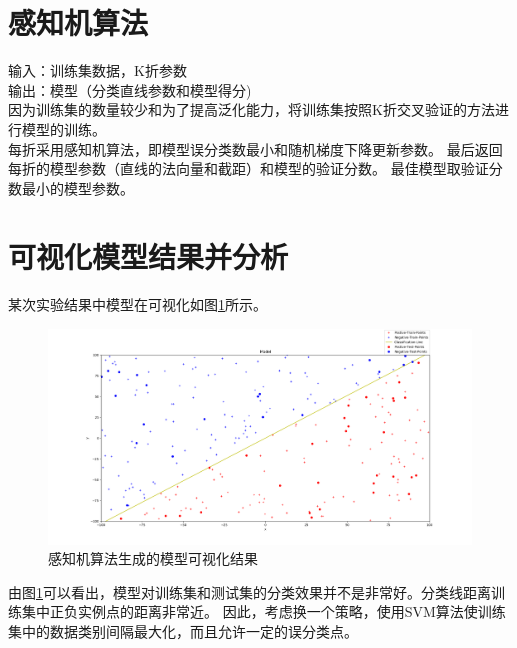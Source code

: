 \documentclass[UTF8,twoside,fontset=none,heading=true,scheme=chinese]{ctexart}
\begin{document}
    \section{感知机算法}
    \noindent 输入：训练集数据，K折参数 \\ 输出：模型（分类直线参数和模型得分) \\
    因为训练集的数量较少和为了提高泛化能力，将训练集按照K折交叉验证的方法进行模型的训练。\\
    每折采用感知机算法，即模型误分类数最小和随机梯度下降更新参数。
    最后返回每折的模型参数（直线的法向量和截距）和模型的验证分数。
    最佳模型取验证分数最小的模型参数。

    \section{可视化模型结果并分析}
    \noindent 某次实验结果中模型在可视化如图\ref{fig:per}所示。
    \begin{figure}[htb]
        \centering
        \includegraphics[scale=0.4]{../Model.png}
        \caption{感知机算法生成的模型可视化结果}
        \label{fig:per}
    \end{figure}
    由图\ref{fig:per}可以看出，模型对训练集和测试集的分类效果并不是非常好。分类线距离训练集中正负实例点的距离非常近。
    因此，考虑换一个策略，使用SVM算法使训练集中的数据类别间隔最大化，而且允许一定的误分类点。
\end{document}
